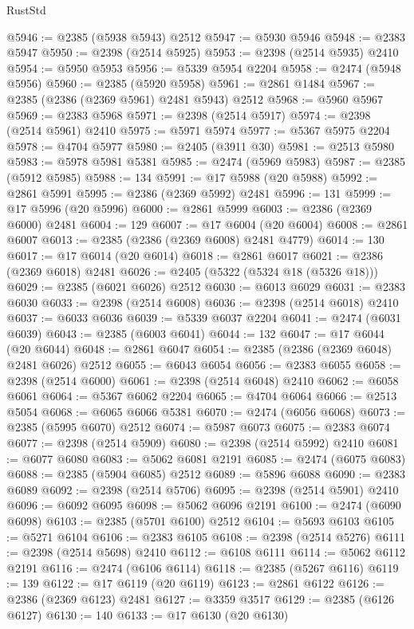 \begin{lexlean}{RustStd}
\begin{coremodule}
{\begin{coremodule}
{{{{{{{{{{{{{{{{{{{{{{{{{{{{{{{{{{{{{{{{{{{{{{{{{{@5946 := @2385 (@5938 @5943) @2512
@5947 := @5930 @5946
@5948 := @2383 @5947
@5950 := @2398 (@2514 @5925)
@5953 := @2398 (@2514 @5935) @2410
@5954 := @5950 @5953
@5956 := @5339 @5954 @2204
@5958 := @2474 (@5948 @5956)
@5960 := @2385 (@5920 @5958)
@5961 := @2861 @1484
@5967 := @2385 (@2386 (@2369 @5961) @2481 @5943) @2512
@5968 := @5960 @5967
@5969 := @2383 @5968
@5971 := @2398 (@2514 @5917)
@5974 := @2398 (@2514 @5961) @2410
@5975 := @5971 @5974
@5977 := @5367 @5975 @2204
@5978 := @4704 @5977
@5980 := @2405 (@3911 @30)
@5981 := @2513 @5980
@5983 := @5978 @5981 @5381
@5985 := @2474 (@5969 @5983)
@5987 := @2385 (@5912 @5985)
@5988 := 134
@5991 := @17 @5988 (@20 @5988)
@5992 := @2861 @5991
@5995 := @2386 (@2369 @5992) @2481
@5996 := 131
@5999 := @17 @5996 (@20 @5996)
@6000 := @2861 @5999
@6003 := @2386 (@2369 @6000) @2481
@6004 := 129
@6007 := @17 @6004 (@20 @6004)
@6008 := @2861 @6007
@6013 := @2385 (@2386 (@2369 @6008) @2481 @4779)
@6014 := 130
@6017 := @17 @6014 (@20 @6014)
@6018 := @2861 @6017
@6021 := @2386 (@2369 @6018) @2481
@6026 := @2405 (@5322 (@5324 @18 (@5326 @18)))
@6029 := @2385 (@6021 @6026) @2512
@6030 := @6013 @6029
@6031 := @2383 @6030
@6033 := @2398 (@2514 @6008)
@6036 := @2398 (@2514 @6018) @2410
@6037 := @6033 @6036
@6039 := @5339 @6037 @2204
@6041 := @2474 (@6031 @6039)
@6043 := @2385 (@6003 @6041)
@6044 := 132
@6047 := @17 @6044 (@20 @6044)
@6048 := @2861 @6047
@6054 := @2385 (@2386 (@2369 @6048) @2481 @6026) @2512
@6055 := @6043 @6054
@6056 := @2383 @6055
@6058 := @2398 (@2514 @6000)
@6061 := @2398 (@2514 @6048) @2410
@6062 := @6058 @6061
@6064 := @5367 @6062 @2204
@6065 := @4704 @6064
@6066 := @2513 @5054
@6068 := @6065 @6066 @5381
@6070 := @2474 (@6056 @6068)
@6073 := @2385 (@5995 @6070) @2512
@6074 := @5987 @6073
@6075 := @2383 @6074
@6077 := @2398 (@2514 @5909)
@6080 := @2398 (@2514 @5992) @2410
@6081 := @6077 @6080
@6083 := @5062 @6081 @2191
@6085 := @2474 (@6075 @6083)
@6088 := @2385 (@5904 @6085) @2512
@6089 := @5896 @6088
@6090 := @2383 @6089
@6092 := @2398 (@2514 @5706)
@6095 := @2398 (@2514 @5901) @2410
@6096 := @6092 @6095
@6098 := @5062 @6096 @2191
@6100 := @2474 (@6090 @6098)
@6103 := @2385 (@5701 @6100) @2512
@6104 := @5693 @6103
@6105 := @5271 @6104
@6106 := @2383 @6105
@6108 := @2398 (@2514 @5276)
@6111 := @2398 (@2514 @5698) @2410
@6112 := @6108 @6111
@6114 := @5062 @6112 @2191
@6116 := @2474 (@6106 @6114)
@6118 := @2385 (@5267 @6116)
@6119 := 139
@6122 := @17 @6119 (@20 @6119)
@6123 := @2861 @6122
@6126 := @2386 (@2369 @6123) @2481
@6127 := @3359 @3517
@6129 := @2385 (@6126 @6127)
@6130 := 140
@6133 := @17 @6130 (@20 @6130)
}}}}}}}}}}}}}}}}}}}}}}}}}}}}}}}}}}}}}}}}}}}}}}}}}}
\end{coremodule}}
\end{coremodule}
\end{lexlean}
